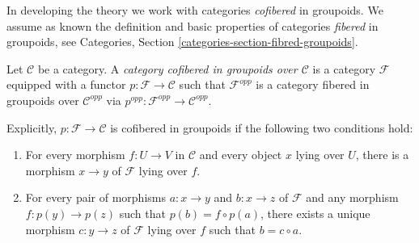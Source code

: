 \noindent
In developing the theory we work with categories {\it cofibered} in groupoids. 
 We assume as known the definition and basic properties of categories 
{\it fibered} in groupoids, see
Categories, Section \ref{categories-section-fibred-groupoids}.

\begin{definition}
\label{definition-category-cofibred-groupoids}
Let $\mathcal{C}$ be a category.  A {\it category cofibered in groupoids over 
$\mathcal{C}$} is a category $\mathcal{F}$ equipped with a functor
$p: \mathcal{F} \to \mathcal{C}$ such that $\mathcal{F}^{opp}$ is a category 
fibered in groupoids over $\mathcal{C}^{opp}$ via
$p^{opp}: \mathcal{F}^{opp} \to \mathcal{C}^{opp}$.
\end{definition}

\noindent
Explicitly, $p: \mathcal{F} \to \mathcal{C}$ is cofibered in groupoids if 
the following two conditions hold:
\begin{enumerate}
\item For every morphism $f: U \to V$ in $\mathcal{C}$ and every object 
$x$ lying over $U$, there is a morphism $x \to y$ of $\mathcal{F}$ lying 
over $f$.
\item For every pair of morphisms $a: x \to y$ and $b: x \to z$ 
of $\mathcal{F}$ and any morphism $f: p(y) \to p(z)$ such that $p(b) = f 
\circ p(a)$, there exists a unique morphism $c: y \to z$ of $\mathcal 
F$ lying over $f$ such that $b = c \circ a$.
\end{enumerate}

